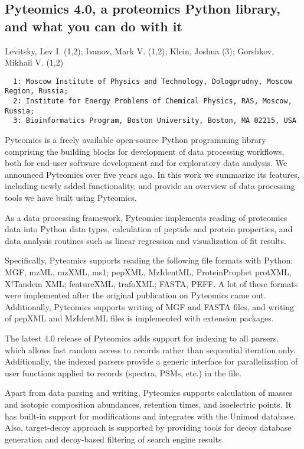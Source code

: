 {\subsection*{\color{eubicRed} Pyteomics 4.0, a proteomics Python library, and what you can do with it}
{\color{eubicGray}Levitsky, Lev I. (1,2);
Ivanov, Mark V. (1,2);
Klein, Joshua (3);
Gorshkov, Mikhail V. (1,2)}
{\color{eubicGray}\begin{verbatim}
  1: Moscow Institute of Physics and Technology, Dologprudny, Moscow Region, Russia;
  2: Institute for Energy Problems of Chemical Physics, RAS, Moscow, Russia;
  3: Bioinformatics Program, Boston University, Boston, MA 02215, USA
\end{verbatim}}

Pyteomics is a freely available open-source Python programming library comprising the building blocks for development of data processing workflows, both for end-user software development and for exploratory data analysis. We announced Pyteomics over five years ago. In this work we summarize its features, including newly added functionality, and provide an overview of data processing tools we have built using Pyteomics.

As a data processing framework, Pyteomics implements reading of proteomics data into Python data types, calculation of peptide and protein properties, and data analysis routines such as linear regression and visualization of fit results.

Specifically, Pyteomics supports reading the following file formats with Python: MGF, mzML, mzXML, ms1; pepXML, MzIdentML, ProteinProphet protXML, X!Tandem XML; featureXML, trafoXML; FASTA, PEFF. A lot of these formats were implemented after the original publication on Pyteomics came out. Additionally, Pyteomics supports writing of MGF and FASTA files, and writing of pepXML and MzIdentML files is implemented with extension packages.

The latest 4.0 release of Pyteomics adds support for indexing to all parsers, which allows fast random access to records rather than sequential iteration only. Additionally, the indexed parsers provide a generic interface for parallelization of user functions applied to records (spectra, PSMs, etc.) in the file.

Apart from data parsing and writing, Pyteomics supports calculation of masses and isotopic composition abundances, retention times, and isoelectric points. It has built-in support for modifications and integrates with the Unimod database. Also, target-decoy approach is supported by providing tools for decoy database generation and decoy-based filtering of search engine results.

}
